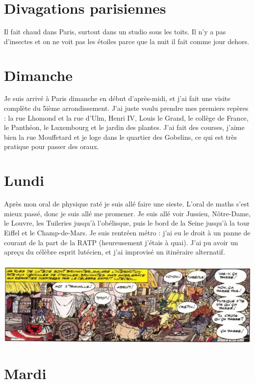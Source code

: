 \documentclass[french,a4paper, 12pt]{article}
\begin{document}
\section*{Divagations parisiennes}

Il fait chaud dans Paris, surtout dans un studio sous les toits. Il n'y a pas d'insectes et on ne voit pas les étoiles parce que la nuit il fait comme jour dehors.

\section*{Dimanche}

Je suis arrivé à Paris dimanche en début d'après-midi, et j'ai fait une visite complète du 5ième arrondissement. J'ai juste voulu prendre mes premiers repères : la rue Lhomond et la rue d'Ulm, Henri IV, Louis le Grand, le collège de France, le Panthéon, le Luxembourg et le jardin des plantes. J'ai fait des courses, j'aime bien la rue Mouffetard et je loge dans le quartier des Gobelins, ce qui est très pratique pour passer des oraux.

\section*{Lundi}

Après mon oral de physique raté je suis allé faire une sieste. L'oral de maths s'est mieux passé, donc je suis allé me promener. Je suis allé voir Jussieu, Nôtre-Dame, le Louvre, les Tuileries jusqu'à l'obélisque, puis le bord de la Seine jusqu'à la tour Eiffel et le Champ-de-Mars. Je suis rentréen métro : j'ai eu le droit à un panne de courant de la part de la RATP (heureusement j'étais à quai). J'ai pu avoir un apreçu du célèbre esprit lutécien, et j'ai improvisé un itinéraire alternatif.

\includegraphics[scale=0.65]{asterix.jpg}

\section*{Mardi}
\end{document}

